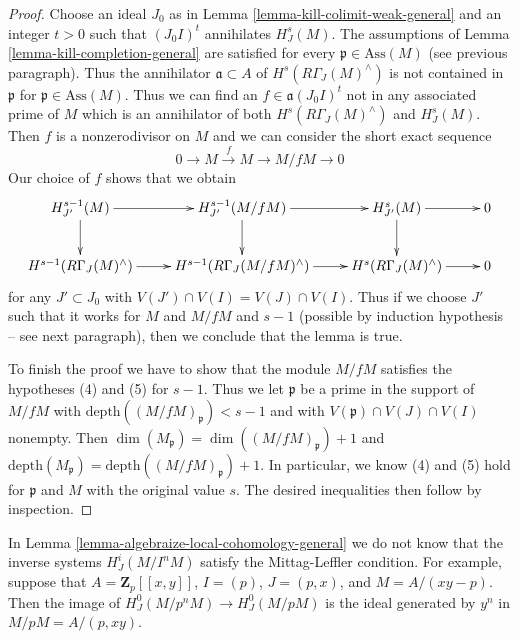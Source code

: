\begin{proof}
\medskip\noindent
Choose an ideal $J_0$ as in Lemma \ref{lemma-kill-colimit-weak-general}
and an integer $t > 0$ such that $(J_0I)^t$ annihilates $H^s_J(M)$.
The assumptions of Lemma \ref{lemma-kill-completion-general}
are satisfied for every $\mathfrak p \in \text{Ass}(M)$
(see previous paragraph).
Thus the annihilator $\mathfrak a \subset A$ of
$H^s(R\Gamma_J(M)^\wedge)$
is not contained in $\mathfrak p$ for $\mathfrak p \in \text{Ass}(M)$.
Thus we can find an $f \in \mathfrak a(J_0I)^t$
not in any associated prime of $M$ which is an annihilator
of both $H^s(R\Gamma_J(M)^\wedge)$ and $H^s_J(M)$.
Then $f$ is a nonzerodivisor on $M$ and we can consider the
short exact sequence
$$
0 \to M \xrightarrow{f} M \to M/fM \to 0
$$
Our choice of $f$ shows that we obtain
$$
\xymatrix{
H^{s - 1}_{J'}(M) \ar[d] \ar[r] &
H^{s - 1}_{J'}(M/fM) \ar[d] \ar[r] &
H^s_{J'}(M) \ar[d] \ar[r] & 0 \\
H^{s - 1}(R\Gamma_J(M)^\wedge) \ar[r] &
H^{s - 1}(R\Gamma_J(M/fM)^\wedge) \ar[r] &
H^s(R\Gamma_J(M)^\wedge) \ar[r] & 0
}
$$
for any $J' \subset J_0$ with $V(J') \cap V(I) = V(J) \cap V(I)$.
Thus if we choose $J'$ such that it works for
$M$ and $M/fM$ and $s - 1$ (possible by induction hypothesis --
see next paragraph), then we conclude that the lemma is true.

\medskip\noindent
To finish the proof we have to show that the module
$M/fM$ satisfies the hypotheses (4) and (5) for $s - 1$.
Thus we let $\mathfrak p$ be a prime in the support
of $M/fM$ with $\text{depth}((M/fM)_\mathfrak p) < s - 1$
and with $V(\mathfrak p) \cap V(J) \cap V(I)$ nonempty.
Then $\dim(M_\mathfrak p) = \dim((M/fM)_\mathfrak p) + 1$
and $\text{depth}(M_\mathfrak p) = \text{depth}((M/fM)_\mathfrak p) + 1$.
In particular, we know (4) and (5) hold for $\mathfrak p$ and $M$
with the original value $s$.
The desired inequalities then follow by inspection.
\end{proof}

\begin{example}
\label{example-no-ML}
In Lemma \ref{lemma-algebraize-local-cohomology-general}
we do not know that the inverse systems $H^i_J(M/I^nM)$ satisfy the
Mittag-Leffler condition.
For example, suppose that $A = \mathbf{Z}_p[[x, y]]$, $I = (p)$,
$J = (p, x)$, and $M = A/(xy - p)$. Then the image of
$H^0_J(M/p^nM) \to H^0_J(M/pM)$
is the ideal generated by $y^n$ in $M/pM = A/(p, xy)$.
\end{example}





